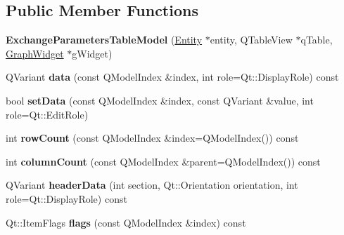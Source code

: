 \subsection*{Public Member Functions}
\begin{DoxyCompactItemize}
\item 
\mbox{\label{class_exchange_parameters_table_model_ad3839c1a18f85673a4cba36b2de2fd15}} 
{\bfseries Exchange\+Parameters\+Table\+Model} (\hyperlink{class_entity}{Entity} $\ast$entity, Q\+Table\+View $\ast$q\+Table, \hyperlink{class_graph_widget}{Graph\+Widget} $\ast$g\+Widget)
\item 
\mbox{\label{class_exchange_parameters_table_model_a2e171aa7eb51a6a453db3d2d1be5e424}} 
Q\+Variant {\bfseries data} (const Q\+Model\+Index \&index, int role=Qt\+::\+Display\+Role) const
\item 
\mbox{\label{class_exchange_parameters_table_model_a84f8864d34de3eec87b7ca1a1263990e}} 
bool {\bfseries set\+Data} (const Q\+Model\+Index \&index, const Q\+Variant \&value, int role=Qt\+::\+Edit\+Role)
\item 
\mbox{\label{class_exchange_parameters_table_model_a58aab5285408bb8794fe6314595ba8ed}} 
int {\bfseries row\+Count} (const Q\+Model\+Index \&index=Q\+Model\+Index()) const
\item 
\mbox{\label{class_exchange_parameters_table_model_a3ee4aa59a4548eee8c373ff6683c92e3}} 
int {\bfseries column\+Count} (const Q\+Model\+Index \&parent=Q\+Model\+Index()) const
\item 
\mbox{\label{class_exchange_parameters_table_model_a1a6b97d3e4ba69024c4fb67c01277b07}} 
Q\+Variant {\bfseries header\+Data} (int section, Qt\+::\+Orientation orientation, int role=Qt\+::\+Display\+Role) const
\item 
\mbox{\label{class_exchange_parameters_table_model_ab34c6b21ea79c2917305c46402825f47}} 
Qt\+::\+Item\+Flags {\bfseries flags} (const Q\+Model\+Index \&index) const
\item 

\end{DoxyCompactItemize}
